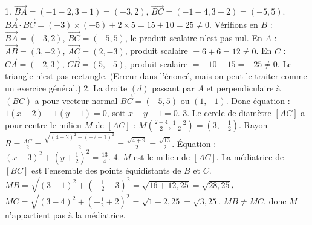 1. $\overrightarrow{BA}=(-1-2,3-1)=(-3,2)$, $\overrightarrow{BC}=(-1-4,3+2)=(-5,5)$. $\overrightarrow{BA}\cdot\overrightarrow{BC}=(-3)\times(-5)+2\times5=15+10=25\neq0$. Vérifions en $B$ : $\overrightarrow{BA}=(-3,2)$, $\overrightarrow{BC}=(-5,5)$, le produit scalaire n'est pas nul. En $A$ : $\overrightarrow{AB}=(3,-2)$, $\overrightarrow{AC}=(2,-3)$, produit scalaire $=6+6=12\neq0$. En $C$ : $\overrightarrow{CA}=(-2,3)$, $\overrightarrow{CB}=(5,-5)$, produit scalaire $=-10-15=-25\neq0$. Le triangle n'est pas rectangle. (Erreur dans l'énoncé, mais on peut le traiter comme un exercice général.)
2. La droite $(d)$ passant par $A$ et perpendiculaire à $(BC)$ a pour vecteur normal $\overrightarrow{BC}=(-5,5)$ ou $(1,-1)$. Donc équation : $1(x-2)-1(y-1)=0$, soit $x-y-1=0$.
3. Le cercle de diamètre $[AC]$ a pour centre le milieu $M$ de $[AC]$ : $M\left(\frac{2+4}{2},\frac{1-2}{2}\right)=(3,-\frac12)$. Rayon $R=\frac{AC}{2}=\frac{\sqrt{(4-2)^2+(-2-1)^2}}{2}=\frac{\sqrt{4+9}}{2}=\frac{\sqrt{13}}{2}$. Équation : $(x-3)^2+(y+\frac12)^2=\frac{13}{4}$.
4. $M$ est le milieu de $[AC]$. La médiatrice de $[BC]$ est l'ensemble des points équidistants de $B$ et $C$. $MB=\sqrt{(3+1)^2+(-\frac12-3)^2}=\sqrt{16+12,25}=\sqrt{28,25}$, $MC=\sqrt{(3-4)^2+(-\frac12+2)^2}=\sqrt{1+2,25}=\sqrt{3,25}$. $MB\neq MC$, donc $M$ n'appartient pas à la médiatrice.